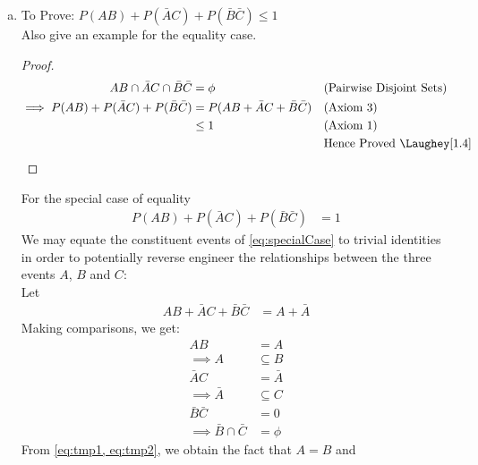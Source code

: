\begin{enumerate}[a.]
\begin{proof}
\begin{align}
					&= P(A) + P(B) - P(AB) + P(\bar{A}\bar{B}) \nonumber\\
					&= P(A) - P(AB) + P(\bar{A}\bar{B}) + P(B)&& \text{(Rearranging the equation)}\nonumber\\
					&= P(A\bar{B}) + P(\bar{A}\bar{B}) + P(B) &&\text{(Using \cref{eq:totalProbLaw})} \nonumber\\
					&= P(\bar{B}) + P(B) &&\text{(Using \cref{eq:totalProbLawB})} \nonumber\\
					&= 1 &&\text{Hence Proved \Laughey[1.4]}\nonumber
				\end{align}
			\end{proof}	
	\item To Prove: $P(AB) + P(\bar A C) + P(\bar B \bar C) \leq 1$ \\
	Also give an example for the equality case.
	\!
		\begin{proof}
			\begin{align}
				AB \cap \bar{A}C \cap \bar{B}\bar{C} &= \phi && \text{(Pairwise Disjoint Sets)} \nonumber\\
				\implies P(AB) + P(\bar{A}C) + P(\bar{B}\bar{C}) &= P( AB + \bar{A}C + \bar{B}\bar{C} ) && \text{(Axiom 3)} \nonumber\\
				&\leq 1 && \text{(Axiom 1)} \nonumber\\
				&{} && \text{Hence Proved \Laughey[1.4]} \nonumber				
			\end{align}
		\end{proof}
	
		For the special case of equality\\
		\begin{align}
			P(AB) + P(\bar{A}C) + P(\bar{B}\bar{C}) &= 1 \label{eq:specialCase}
		\end{align}
		We may equate the constituent events of \cref{eq:specialCase} to trivial identities in order to potentially reverse engineer the relationships between the three events $A$, $B$ and $C$:\\[5pt]
		Let\\[-20pt]
		\begin{align}
			AB + \bar{A}C + \bar{B}\bar{C} &= A + \bar{A}
		\end{align}
		Making comparisons, we get:
		\begin{align}
			AB &= A \nonumber\\
			\implies A &\subseteq B \label{eq:tmp1}\\
			\bar{A}C &= \bar{A} \nonumber\\
			\implies \bar{A} &\subseteq C \label{eq:tmp2}\\
			\bar{B}\bar{C} &= 0 \nonumber\\
			\implies \bar{B} \cap \bar{C} &= \phi \label{eq:tmp3} 
		\end{align}
		From \cref{eq:tmp1, eq:tmp2}, we obtain the fact that $A = B$ and 	
\end{enumerate}